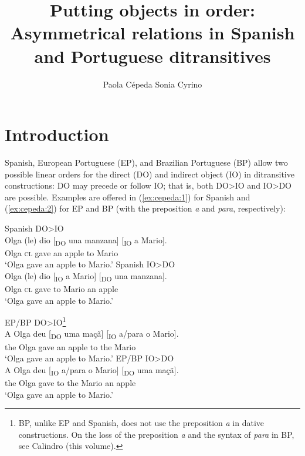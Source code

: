 \documentclass[output=paper,colorlinks,citecolor=brown,nonflat]{./langscibook}
\author{Paola Cépeda\affiliation{Stony Brook University / Pontificia Universidad Católica del Perú}\lastand 
Sonia Cyrino\affiliation{University of Campinas}}
\title{Putting objects in order: Asymmetrical relations in Spanish and Portuguese ditransitives}
\begin{document}
\maketitle
{}

\section{Introduction}\label{sec:cepeda:1}

Spanish, European Portuguese (EP), and Brazilian Portuguese (BP) allow two possible linear orders for the direct (DO) and indirect object (IO) in ditransitive constructions: DO may precede or follow IO; that is, both DO>IO and IO>DO are possible. Examples are offered in (\ref{ex:cepeda:1}) for Spanish and (\ref{ex:cepeda:2}) for EP and BP (with the preposition \textit{a} and \textit{para}, respectively):

\ea%
    \label{ex:cepeda:1}
	\ea\label{ex:cepeda:1a}
	Spanish DO>IO\\
	\gll Olga (le) dio [\textsubscript{DO} una manzana] [\textsubscript{IO} a  Mario]. \\
		Olga \textsc{cl} gave \hspaceThis{[\textsubscript{DO}} an apple \hspaceThis{[\textsubscript{IO}} to Mario \\
	\glt ‘Olga gave an apple to Mario.'
	\ex\label{ex:cepeda:1b}Spanish IO>DO\\
		\gll Olga (le) dio [\textsubscript{IO} a  Mario] [\textsubscript{DO} una manzana]. \\
			Olga \textsc{cl} gave \hspaceThis{[\textsubscript{IO}} to Mario \hspaceThis{[\textsubscript{DO}} an   apple\\
		\glt ‘Olga gave an apple to Mario.’
	\z
\z

\ea%
    \label{ex:cepeda:2}
	\ea\label{ex:cepeda:2a}
	EP/BP DO>IO\footnote{BP, unlike EP and Spanish, does not use the preposition \textit{a} in dative constructions. On the loss of the preposition \textit{a} and the syntax of \textit{para} in BP, see Calindro (this volume).}\\
	\gll A Olga  deu [\textsubscript{DO} uma maçã] [\textsubscript{IO} a/para  o  Mario].\\
		the Olga gave  \hspaceThis{[\textsubscript{DO}} an   apple \hspaceThis{[\textsubscript{IO}} to the Mario \\
	\glt ‘Olga gave an apple to Mario.’
	\ex\label{ex:cepeda:2b}EP/BP IO>DO\\
	\gll A Olga  deu [\textsubscript{IO} a/para  o  Mario] [\textsubscript{DO} uma maçã]. \\
		the Olga gave \hspaceThis{[\textsubscript{IO}} to the Mario \hspaceThis{[\textsubscript{DO}} an   apple \\
	\glt ‘Olga gave an apple to Mario.’
	\z
\z
\end{document}
